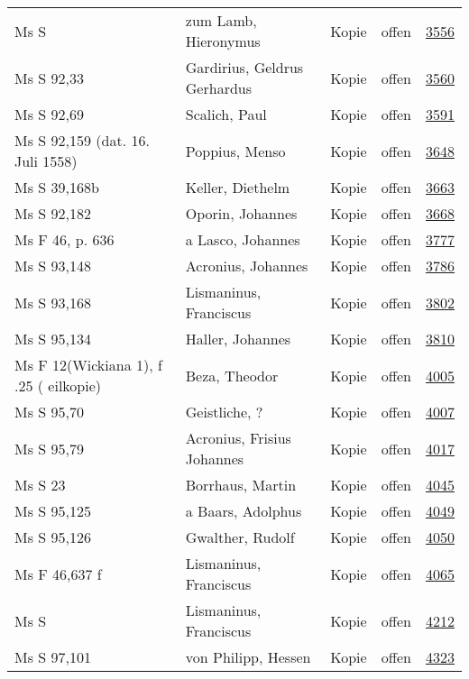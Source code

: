 \documentclass[10pt,a4paper,landscape]{report}
\begin{document}
\begin{longtable}{p{16cm}p{4cm}llr}
Ms S	&	zum Lamb, Hieronymus	&	Kopie	&	offen	&	\href{http://130.60.24.72/assignment/3556}{3556}\\
Ms S 92,33	&	Gardirius, Geldrus Gerhardus	&	Kopie	&	offen	&	\href{http://130.60.24.72/assignment/3560}{3560}\\
Ms S 92,69	&	Scalich, Paul	&	Kopie	&	offen	&	\href{http://130.60.24.72/assignment/3591}{3591}\\
Ms S 92,159 (dat. 16. Juli 1558)	&	Poppius, Menso	&	Kopie	&	offen	&	\href{http://130.60.24.72/assignment/3648}{3648}\\
Ms S 39,168b	&	Keller, Diethelm	&	Kopie	&	offen	&	\href{http://130.60.24.72/assignment/3663}{3663}\\
Ms S 92,182	&	Oporin, Johannes	&	Kopie	&	offen	&	\href{http://130.60.24.72/assignment/3668}{3668}\\
Ms F 46, p. 636	&	a Lasco, Johannes	&	Kopie	&	offen	&	\href{http://130.60.24.72/assignment/3777}{3777}\\
Ms S 93,148	&	Acronius, Johannes	&	Kopie	&	offen	&	\href{http://130.60.24.72/assignment/3786}{3786}\\
Ms S 93,168	&	Lismaninus, Franciscus	&	Kopie	&	offen	&	\href{http://130.60.24.72/assignment/3802}{3802}\\
Ms S 95,134	&	Haller, Johannes	&	Kopie	&	offen	&	\href{http://130.60.24.72/assignment/3810}{3810}\\
Ms F 12(Wickiana 1), f .25 ( eilkopie)	&	Beza, Theodor	&	Kopie	&	offen	&	\href{http://130.60.24.72/assignment/4005}{4005}\\
Ms S 95,70	&	Geistliche, ?	&	Kopie	&	offen	&	\href{http://130.60.24.72/assignment/4007}{4007}\\
Ms S 95,79	&	Acronius, Frisius Johannes	&	Kopie	&	offen	&	\href{http://130.60.24.72/assignment/4017}{4017}\\
Ms S 23	&	Borrhaus, Martin	&	Kopie	&	offen	&	\href{http://130.60.24.72/assignment/4045}{4045}\\
Ms S 95,125	&	a Baars, Adolphus	&	Kopie	&	offen	&	\href{http://130.60.24.72/assignment/4049}{4049}\\
Ms S 95,126	&	Gwalther, Rudolf	&	Kopie	&	offen	&	\href{http://130.60.24.72/assignment/4050}{4050}\\
Ms F 46,637 f	&	Lismaninus, Franciscus	&	Kopie	&	offen	&	\href{http://130.60.24.72/assignment/4065}{4065}\\
Ms S	&	Lismaninus, Franciscus	&	Kopie	&	offen	&	\href{http://130.60.24.72/assignment/4212}{4212}\\
Ms S 97,101	&	von Philipp, Hessen	&	Kopie	&	offen	&	\href{http://130.60.24.72/assignment/4323}{4323}\\

\end{longtable}
\end{document}
